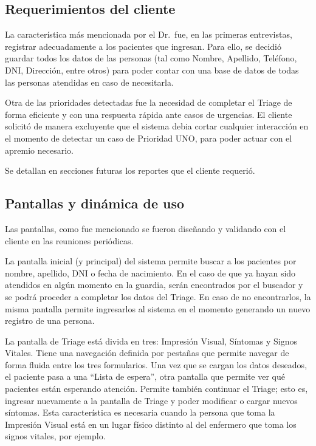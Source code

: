 \subsection{Requerimientos del cliente}
La característica más mencionada por el Dr.\ fue, en las primeras entrevistas, registrar adecuadamente a los pacientes que ingresan. Para ello, se decidió guardar todos los datos de las personas (tal como Nombre, Apellido, Teléfono, DNI, Dirección, entre otros) para poder contar con una base de datos de todas las personas atendidas en caso de necesitarla. 

Otra de las prioridades detectadas fue la necesidad de completar el Triage de forma eficiente y con una respuesta rápida ante casos de urgencias. El cliente solicitó de manera excluyente que el sistema debia cortar cualquier interacción en el momento de detectar un caso de Prioridad UNO, para poder actuar con el apremio necesario.

Se detallan en secciones futuras los reportes que el cliente requerió.


\subsection{Pantallas y dinámica de uso}
Las pantallas, como fue mencionado se fueron diseñando y validando con el cliente en las reuniones periódicas.

La pantalla inicial (y principal) del sistema permite buscar a los pacientes por nombre, apellido, DNI o fecha de nacimiento. En el caso de que ya hayan sido atendidos en algún momento en la guardia, serán encontrados por el buscador y se podrá proceder a completar los datos del Triage. En caso de no encontrarlos, la misma pantalla permite ingresarlos al sistema en el momento generando un nuevo registro de una persona. 

La pantalla de Triage está divida en tres: Impresión Visual, Síntomas y Signos Vitales. Tiene una navegación definida por pestañas que permite navegar de forma fluida entre los tres formularios. Una vez que se cargan los datos deseados, el paciente pasa a una ``Lista de espera'', otra pantalla que permite ver qué pacientes están esperando atención. Permite también continuar el Triage; esto es, ingresar nuevamente a la pantalla de Triage y poder modificar o cargar nuevos síntomas. Esta característica es necesaria cuando la persona que toma la Impresión Visual está en un lugar físico distinto al del enfermero que toma los signos vitales, por ejemplo.

